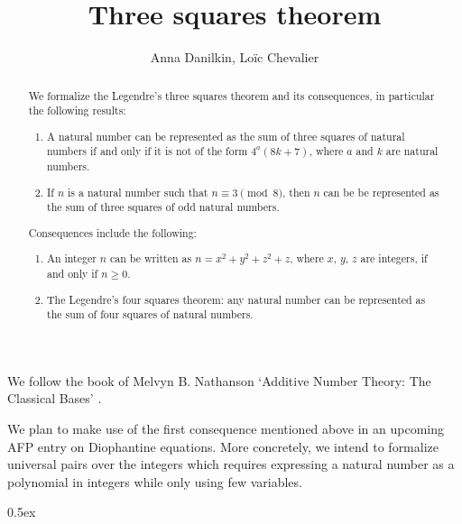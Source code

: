 \documentclass[11pt, a4paper]{article}
\begin{document}
\title{Three squares theorem}
\author{Anna Danilkin, Loïc Chevalier}
\maketitle

\begin{abstract}
  We formalize the Legendre's three squares theorem and its consequences,
  in particular the following results:
  \begin{enumerate}
    \item A natural number can be represented as the sum of
          three squares of natural numbers if and only if it is not
          of the form $4^a (8 k + 7)$, where $a$ and $k$ are natural numbers.
    \item If $n$ is a natural number such that $n \equiv 3 \pmod{8}$,
          then $n$ can be be represented as the sum of three squares
          of odd natural numbers.
  \end{enumerate}

  Consequences include the following:
  \begin{enumerate}
    \item An integer $n$ can be written as $n = x^2 + y^2 + z^2 + z$,
          where $x$, $y$, $z$ are integers, if and only if $n \geq 0$.
    \item The Legendre's four squares theorem: any natural number
          can be represented as the sum of four squares of natural numbers.
  \end{enumerate}
\end{abstract}

We follow the book of Melvyn B. Nathanson
`Additive Number Theory: The Classical Bases' \cite{nathanson1996}.

We plan to make use of the first consequence mentioned above in an
upcoming AFP entry on Diophantine equations. More concretely, we intend
to formalize universal pairs over the integers which requires expressing
a natural number as a polynomial in integers while only using few variables.

\tableofcontents

\parindent 0pt\parskip 0.5ex





\end{document}
